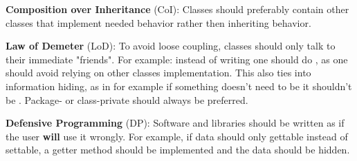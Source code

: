 \documentclass{article}
\begin{document}
\begin{enumerate}
        \textbf{Composition over Inheritance} (CoI):\newline
        Classes should preferably contain other classes that implement needed behavior rather
        then inheriting behavior.

        \textbf{Law of Demeter} (LoD):\newline
        To avoid loose coupling, classes should only talk to their immediate "friends".\newline
        For example: instead of writing  one should do ,
        as one should avoid relying on other classes implementation. This also ties into
        information hiding, as in for example if something doesn't need to be  it shouldn't
        be . Package- or class-private should always be preferred.

        \textbf{Defensive Programming} (DP):\newline
        Software and libraries should be written as if the user \textbf{will} use it wrongly.
        For example, if data should only gettable instead of settable, a getter method
        should be implemented and the data should be hidden.
\end{enumerate}
\newpage
\end{document}
